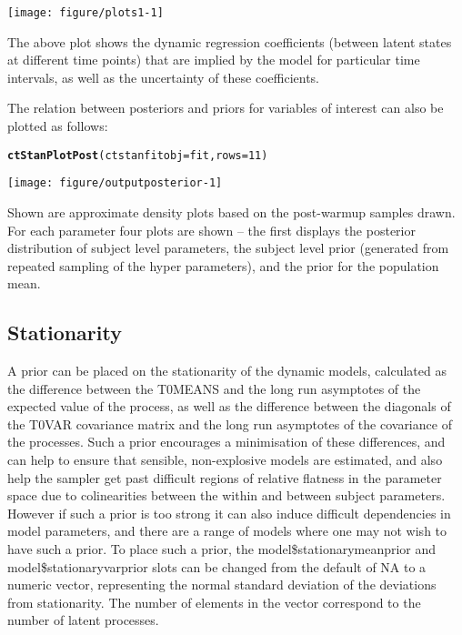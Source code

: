 \documentclass[nojss]{jss}\usepackage[]{graphicx}\usepackage[]{color}
\makeatletter
\def\maxwidth{ %
  \ifdim\Gin@nat@width>\linewidth
    \linewidth
  \else
    \Gin@nat@width
  \fi
}
\newcommand{\hlnum}[1]{\textcolor[rgb]{0.686,0.059,0.569}{#1}}%
\newcommand{\hlstd}[1]{\textcolor[rgb]{0.345,0.345,0.345}{#1}}%
\newcommand{\hlkwc}[1]{\textcolor[rgb]{0.333,0.667,0.333}{#1}}%
\newcommand{\hlkwd}[1]{\textcolor[rgb]{0.737,0.353,0.396}{\textbf{#1}}}%
\newenvironment{kframe}{%
 \def\at@end@of@kframe{}%
 \ifinner\ifhmode%
  \def\at@end@of@kframe{\end{minipage}}%
  \begin{minipage}{\columnwidth}%
 \fi\fi%
 \def\FrameCommand##1{\hskip\@totalleftmargin \hskip-\fboxsep
 \colorbox{shadecolor}{##1}\hskip-\fboxsep
     \hskip-\linewidth \hskip-\@totalleftmargin \hskip\columnwidth}%
 \MakeFramed {\advance\hsize-\width
   \@totalleftmargin\z@ \linewidth\hsize
   \@setminipage}}%
 {\par\unskip\endMakeFramed%
 \at@end@of@kframe}
\newenvironment{knitrout}{}{} %
\makeatother
\begin{document}
\begin{knitrout}\small
{}\color{fgcolor}

{\centering \texttt{[image: figure/plots1-1]} 

}



\end{knitrout}

The above plot shows the dynamic regression coefficients (between latent states at different time points) that are implied by the model for particular time intervals, as well as the uncertainty of these coefficients.

The relation between posteriors and priors for variables of interest can also be plotted as follows:

\begin{knitrout}\small
{}\color{fgcolor}\begin{kframe}
\begin{alltt}
\hlkwd{ctStanPlotPost}\hlstd{(}\hlkwc{ctstanfitobj} \hlstd{= fit,} \hlkwc{rows}\hlstd{=}\hlnum{11}\hlstd{)}
\end{alltt}
\end{kframe}

{\centering \texttt{[image: figure/outputposterior-1]} 

}



\end{knitrout}

Shown are approximate density plots based on the post-warmup samples drawn. For each parameter four plots are shown -- the first displays the posterior distribution of subject level parameters, the subject level prior (generated from repeated sampling of the hyper parameters), and the prior for the population mean.


\subsection{Stationarity}
A prior can be placed on the stationarity of the dynamic models, calculated as the difference between the T0MEANS and the long run asymptotes of the expected value of the process, as well as the difference between the diagonals of the T0VAR covariance matrix and the long run asymptotes of the covariance of the processes. Such a prior encourages a minimisation of these differences, and can help to ensure that sensible, non-explosive models are estimated, and also help the sampler get past difficult regions of relative flatness in the parameter space due to colinearities between the within and between subject parameters. However if such a prior is too strong it can also induce difficult dependencies in model parameters, and there are a range of models where one may not wish to have such a prior. To place such a prior, the model\$stationarymeanprior and model\$stationaryvarprior slots can be changed from the default of NA to a numeric vector, representing the normal standard deviation of the deviations from stationarity. The number of elements in the vector correspond to the number of latent processes.
\end{document}
